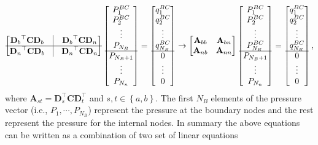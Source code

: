\documentclass[%
 amsmath,amssymb,
prstper,
]{revtex4-2}
\begin{document}
\begin{align}
 \begin{bmatrix} {\mathbf{D}_{b}}^\top \mathbf{C} {\mathbf{D}_{b}}  & \vline &    {\mathbf{D}_{b}}^\top \mathbf{C} {\mathbf{D}_{n}}\\ \hline   
    {\mathbf{D}_{n}}^\top \mathbf{C} {\mathbf{D}_{b}} & \vline & {\mathbf{D}_{n}}^\top \mathbf{C} {\mathbf{D}_{n}}
    \end{bmatrix} \begin{bmatrix} P^{BC}_1 \\ P^{BC}_2 \\ \vdots \\ P_{N_B} \\  \hline  P_{N_B+1} \\ \vdots \\ P_{N_n}
    \end{bmatrix} = \begin{bmatrix} q^{BC}_1 \\ q^{BC}_2 \\ \vdots \\ q^{BC}_{N_B} \\ \hline  0 \\ \vdots \\ 0\end{bmatrix} \to 
    \begin{bmatrix} 
    \mathbf{A}_{bb} & \mathbf{A}_{bn} \\
    \mathbf{A}_{nb} & \mathbf{A}_{nn}       
    \end{bmatrix} \begin{bmatrix} P^{BC}_1 \\ P^{BC}_2 \\ \vdots \\ P^{BC}_{N_B} \\ \hline  P_{N_B+1} \\ \vdots \\ P_{N_n}
    \end{bmatrix} = \begin{bmatrix} q^{BC}_1 \\ q^{BC}_2 \\ \vdots \\ q^{BC}_{N_B}  \\ \hline  0 \\ \vdots \\ 0\end{bmatrix}, 
\end{align}
%
where $\mathbf{A}_{st} = \mathbf{D}^\top_s \mathbf{C}\mathbf{D}^\top_t$ and  $s,t\in\left\{a,b\right\}$. The first $N_B$ elements of the pressure vector (i.e., $P_1, \cdots, P_{N_B}$) represent the pressure at the boundary nodes and the rest represent the pressure for the internal nodes. In summary the above equations can be written as a combination of two set of linear equations 
\end{document}
